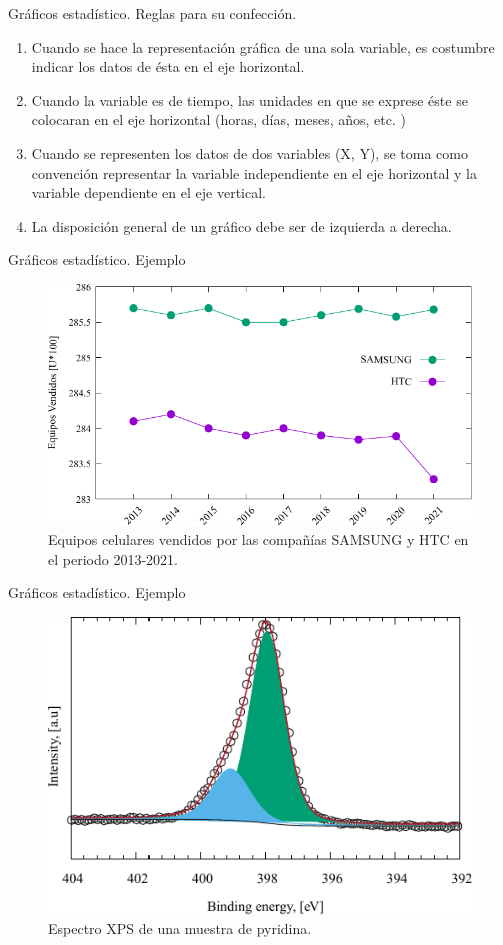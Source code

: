 \documentclass[11pt]{beamer}
\begin{document}
      \begin{frame}{Gráficos estadístico. Reglas para su confección.}
        \begin{enumerate}
            \item Cuando se hace la representación gráfica de una sola variable, es costumbre indicar los datos de ésta en el eje horizontal.
            \item Cuando la variable es de tiempo, las unidades en que se exprese éste se colocaran en el eje horizontal (horas, días, meses, a\~nos, etc. )
            \item Cuando se representen los datos de dos variables (X, Y), se toma como convención representar la variable independiente en el eje horizontal y la variable dependiente en el eje vertical.
            \item La disposición general de un gráfico debe ser de izquierda a derecha.
        \end{enumerate}
      \end{frame}

      \begin{frame}{Gráficos estadístico. Ejemplo}
        \begin{figure}
            \centering
            \includegraphics[width=0.7\linewidth]{images/Lecture_1h}
            \caption{Equipos celulares vendidos por las compañías SAMSUNG y HTC en el periodo 2013-2021. }
            \label{fig:lecture1h}
        \end{figure}
      \end{frame}

      \begin{frame}{Gráficos estadístico. Ejemplo}
        \begin{figure}
            \centering
            \includegraphics[width=0.7\linewidth]{images/Lecture_1i}
            \caption{Espectro XPS de una muestra de pyridina. }
            \label{fig:lecture1i}
        \end{figure}

      \end{frame}
\end{document}
